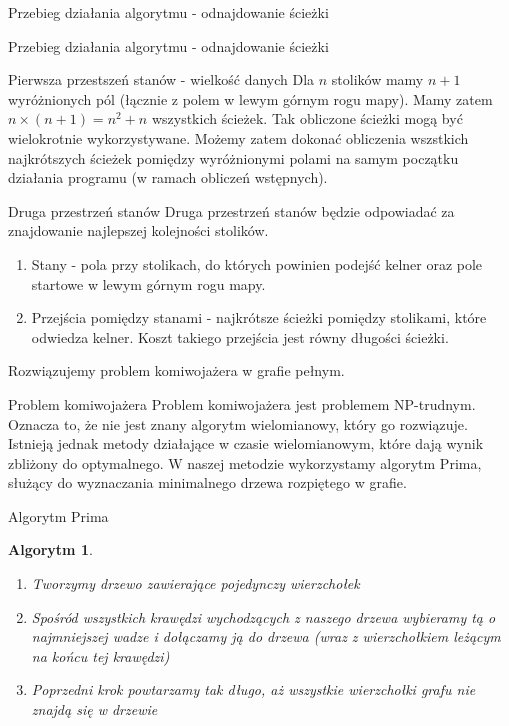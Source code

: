 \documentclass[a4paper,10pt]{beamer}
\newtheorem{alg}{Algorytm}[subsection]
\begin{document}
		\begin{frame}{Przebieg działania algorytmu - odnajdowanie ścieżki}
		\end{frame}
		\begin{frame}{Przebieg działania algorytmu - odnajdowanie ścieżki}
		\end{frame}
		\begin{frame}{Pierwsza przestszeń stanów - wielkość danych}
			Dla $n$ stolików mamy $n+1$ wyróżnionych pól (łącznie z polem w lewym górnym rogu mapy). Mamy zatem $n \times (n+1) = n^2 + n$ wszystkich ścieżek. Tak obliczone ścieżki mogą być wielokrotnie wykorzystywane. Możemy zatem dokonać obliczenia wszstkich najkrótszych ścieżek pomiędzy wyróżnionymi polami na samym początku działania programu (w ramach obliczeń wstępnych).
		\end{frame}
		\begin{frame}{Druga przestrzeń stanów}
			Druga przestrzeń stanów będzie odpowiadać za znajdowanie najlepszej kolejności stolików.
			\begin{enumerate}
				\item Stany - pola przy stolikach, do których powinien podejść kelner oraz pole startowe w lewym górnym rogu mapy.
				\item Przejścia pomiędzy stanami - najkrótsze ścieżki pomiędzy stolikami, które odwiedza kelner. Koszt takiego przejścia jest równy długości ścieżki.
			\end{enumerate}
			Rozwiązujemy problem komiwojażera w grafie pełnym.
		\end{frame}
		\begin{frame}{Problem komiwojażera}
			Problem komiwojażera jest problemem NP-trudnym. Oznacza to, że nie jest znany algorytm wielomianowy, który go rozwiązuje. Istnieją jednak metody działające w czasie wielomianowym, które dają wynik zbliżony do optymalnego. W naszej metodzie wykorzystamy algorytm Prima, służący do wyznaczania minimalnego drzewa rozpiętego w grafie.
		\end{frame}
		\begin{frame}{Algorytm Prima}
			\begin{alg}
				\begin{enumerate}
					\item Tworzymy drzewo zawierające pojedynczy wierzchołek
					\item Spośród wszystkich krawędzi wychodzących z naszego drzewa wybieramy tą o najmniejszej wadze i dołączamy ją do drzewa (wraz z wierzchołkiem leżącym na końcu tej krawędzi)
					\item Poprzedni krok powtarzamy tak długo, aż wszystkie wierzchołki grafu nie znajdą się w drzewie
				\end{enumerate}
			\end{alg}
		\end{frame}	
\end{document}
